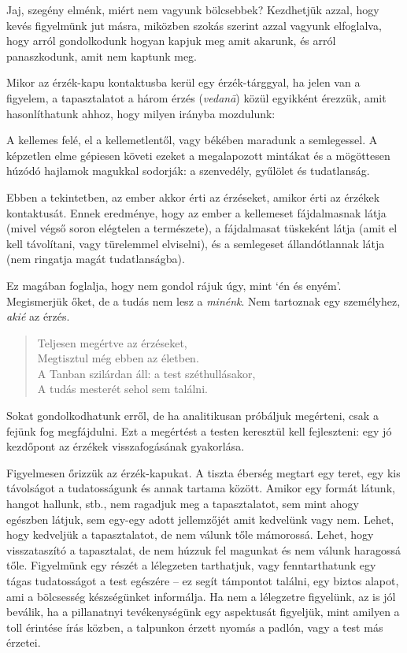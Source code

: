 Jaj, szegény elménk, miért nem vagyunk bölcsebbek? Kezdhetjük azzal,
hogy kevés figyelmünk jut másra, miközben szokás szerint azzal vagyunk
elfoglalva, hogy arról gondolkodunk hogyan kapjuk meg amit akarunk, és
arról panaszkodunk, amit nem kaptunk meg.

Mikor az érzék-kapu kontaktusba kerül egy érzék-tárggyal, ha jelen van a
figyelem, a tapasztalatot a három érzés (\emph{vedanā}) közül egyikként
érezzük, amit hasonlíthatunk ahhoz, hogy milyen irányba mozdulunk:

A kellemes felé, el a kellemetlentől, vagy békében maradunk a
semlegessel. A képzetlen elme gépiesen követi ezeket a megalapozott
mintákat és a mögöttesen húzódó hajlamok magukkal sodorják: a
szenvedély, gyűlölet és tudatlanság.

Ebben a tekintetben, az ember akkor érti az érzéseket, amikor érti az
érzékek kontaktusát. Ennek eredménye, hogy az ember a kellemeset
fájdalmasnak látja (mivel végső soron elégtelen a természete), a
fájdalmasat tüskeként látja (amit el kell távolítani, vagy türelemmel
elviselni), és a semlegeset állandótlannak látja (nem ringatja magát
tudatlanságba).

Ez magában foglalja, hogy nem gondol rájuk úgy, mint `én és enyém'.
Megismerjük őket, de a tudás nem lesz a \emph{minénk}. Nem tartoznak egy
személyhez, \emph{akié} az érzés.

\begin{quote}
Teljesen megértve az érzéseket,\\
Megtisztul még ebben az életben.\\
A Tanban szilárdan áll: a test széthullásakor,\\
A tudás mesterét sehol sem találni.

\bigskip

\end{quote}


Sokat gondolkodhatunk erről, de ha analitikusan próbáljuk megérteni,
csak a fejünk fog megfájdulni. Ezt a megértést a testen keresztül kell
fejleszteni: egy jó kezdőpont az érzékek visszafogásának gyakorlása.

Figyelmesen őrizzük az érzék-kapukat. A tiszta éberség megtart egy
teret, egy kis távolságot a tudatosságunk és annak tartama között.
Amikor egy formát látunk, hangot hallunk, stb., nem ragadjuk meg a
tapasztalatot, sem mint ahogy egészben látjuk, sem egy-egy adott
jellemzőjét amit kedvelünk vagy nem. Lehet, hogy kedveljük a
tapasztalatot, de nem válunk tőle mámorossá. Lehet, hogy visszataszító a
tapasztalat, de nem húzzuk fel magunkat és nem válunk haragossá tőle.
Figyelmünk egy részét a lélegzeten tarthatjuk, vagy fenntarthatunk egy
tágas tudatosságot a test egészére -- ez segít támpontot találni, egy
biztos alapot, ami a bölcsesség készségünket informálja. Ha nem a
lélegzetre figyelünk, az is jól beválik, ha a pillanatnyi tevékenységünk
egy aspektusát figyeljük, mint amilyen a toll érintése írás közben, a
talpunkon érzett nyomás a padlón, vagy a test más érzetei.

